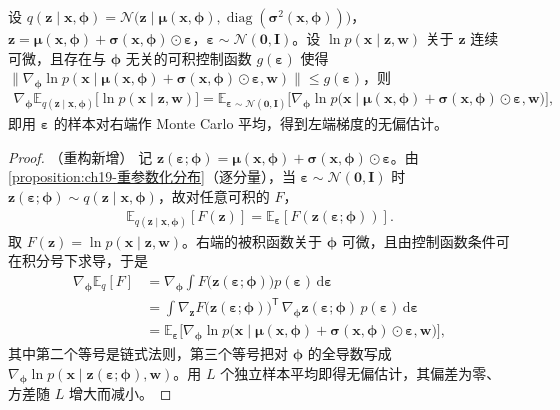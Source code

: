 \documentclass[../../main.tex]{subfiles}
\begin{document}
\begin{proposition}\label{proposition:ch19-重参数化梯度}
设 $q(\bm{z}\mid\bm{x},\bm{\phi})=\mathcal{N}\big(\bm{z}\mid\bm{\mu}(\bm{x},\bm{\phi}),\operatorname{diag}(\bm{\sigma}^{2}(\bm{x},\bm{\phi}))\big)$，$\bm{z}=\bm{\mu}(\bm{x},\bm{\phi})+\bm{\sigma}(\bm{x},\bm{\phi})\odot\bm{\varepsilon}$，$\bm{\varepsilon}\sim\mathcal{N}(\bm{0},\bm{I})$。设 $\ln p(\bm{x}\mid\bm{z},\bm{w})$ 关于 $\bm{z}$ 连续可微，且存在与 $\bm{\phi}$ 无关的可积控制函数 $g(\bm{\varepsilon})$ 使得 $\|\nabla_{\bm{\phi}}\ln p(\bm{x}\mid\bm{\mu}(\bm{x},\bm{\phi})+\bm{\sigma}(\bm{x},\bm{\phi})\odot\bm{\varepsilon},\bm{w})\|\leqslant g(\bm{\varepsilon})$，则
\begin{align*}
\nabla_{\bm{\phi}}\mathbb{E}_{q(\bm{z}\mid\bm{x},\bm{\phi})}\big[\ln p(\bm{x}\mid\bm{z},\bm{w})\big]=\mathbb{E}_{\bm{\varepsilon}\sim\mathcal{N}(\bm{0},\bm{I})}\big[\nabla_{\bm{\phi}}\ln p\big(\bm{x}\mid\bm{\mu}(\bm{x},\bm{\phi})+\bm{\sigma}(\bm{x},\bm{\phi})\odot\bm{\varepsilon},\bm{w}\big)\big],
\end{align*}
即用 $\bm{\varepsilon}$ 的样本对右端作 Monte Carlo 平均，得到左端梯度的无偏估计。
\end{proposition}
\begin{proof}（重构新增）
记 $\bm{z}(\bm{\varepsilon};\bm{\phi})=\bm{\mu}(\bm{x},\bm{\phi})+\bm{\sigma}(\bm{x},\bm{\phi})\odot\bm{\varepsilon}$。由\cref{proposition:ch19-重参数化分布}（逐分量），当 $\bm{\varepsilon}\sim\mathcal{N}(\bm{0},\bm{I})$ 时 $\bm{z}(\bm{\varepsilon};\bm{\phi})\sim q(\bm{z}\mid\bm{x},\bm{\phi})$，故对任意可积的 $F$，
\begin{align*}
\mathbb{E}_{q(\bm{z}\mid\bm{x},\bm{\phi})}[F(\bm{z})]=\mathbb{E}_{\bm{\varepsilon}}[F(\bm{z}(\bm{\varepsilon};\bm{\phi}))].
\end{align*}
取 $F(\bm{z})=\ln p(\bm{x}\mid\bm{z},\bm{w})$。右端的被积函数关于 $\bm{\phi}$ 可微，且由控制函数条件可在积分号下求导，于是
\begin{align*}
\nabla_{\bm{\phi}}\mathbb{E}_{q}[F]&=\nabla_{\bm{\phi}}\int F\big(\bm{z}(\bm{\varepsilon};\bm{\phi})\big)p(\bm{\varepsilon})\,\mathrm{d}\bm{\varepsilon}\\
&=\int\nabla_{\bm{z}}F\big(\bm{z}(\bm{\varepsilon};\bm{\phi})\big)^{\mathsf T}\,\nabla_{\bm{\phi}}\bm{z}(\bm{\varepsilon};\bm{\phi})\,p(\bm{\varepsilon})\,\mathrm{d}\bm{\varepsilon}\\
&=\mathbb{E}_{\bm{\varepsilon}}\Big[\nabla_{\bm{\phi}}\ln p\big(\bm{x}\mid\bm{\mu}(\bm{x},\bm{\phi})+\bm{\sigma}(\bm{x},\bm{\phi})\odot\bm{\varepsilon},\bm{w}\big)\Big],
\end{align*}
其中第二个等号是链式法则，第三个等号把对 $\bm{\phi}$ 的全导数写成 $\nabla_{\bm{\phi}}\ln p(\bm{x}\mid\bm{z}(\bm{\varepsilon};\bm{\phi}),\bm{w})$。用 $L$ 个独立样本平均即得无偏估计，其偏差为零、方差随 $L$ 增大而减小。
\end{proof}
\end{document}
